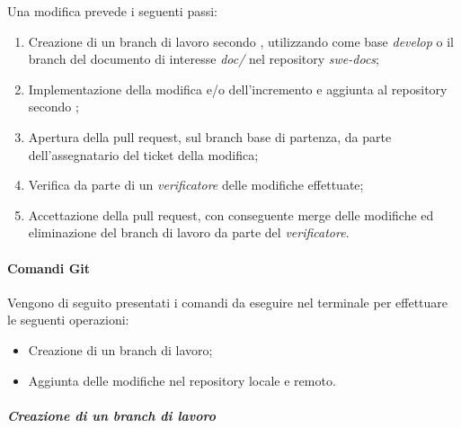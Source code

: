 Una modifica prevede i seguenti passi:
\begin{enumerate}
	\item Creazione di un branch di lavoro secondo , utilizzando come base \emph{develop} o il 
		branch del documento di interesse \emph{doc/} nel repository \emph{swe-docs};
	\item Implementazione della modifica e/o dell'incremento e aggiunta al repository secondo ;
	\item Apertura della pull request, sul branch base di partenza, da parte dell'assegnatario del ticket della modifica;
	\item Verifica da parte di un \emph{verificatore} delle modifiche effettuate;
	\item Accettazione della pull request, con conseguente merge delle modifiche ed eliminazione del branch di lavoro da parte del 
		\emph{verificatore}.
\end{enumerate}

\paragraph{Comandi Git}
\label{par:comandi_git}

Vengono di seguito presentati i comandi da eseguire nel terminale per effettuare le seguenti operazioni:
\begin{itemize}
	\item Creazione di un branch di lavoro;
	\item Aggiunta delle modifiche nel repository locale e remoto.
\end{itemize}

\subparagraph{Creazione di un branch di lavoro}
\label{spar:creazione_branch}

